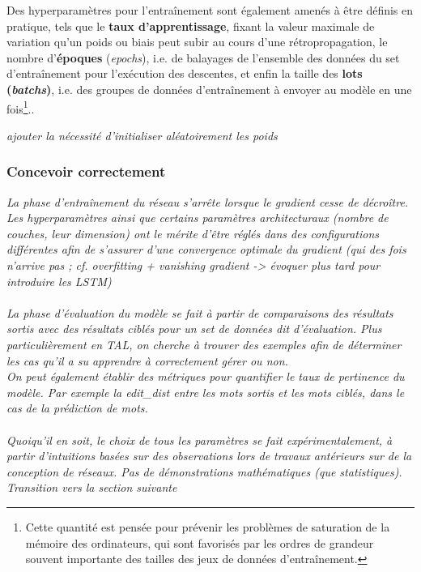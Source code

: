 \documentclass[12pt, french, twoside]{report}
\begin{document}
Des hyperparamètres pour l'entraînement sont également amenés à être définis en pratique, tels que le \textbf{taux d'apprentissage}, fixant la valeur maximale de variation qu'un poids ou biais peut subir au cours d'une rétropropagation, le nombre d'\textbf{époques} (\textit{epochs}), i.e. de balayages de l'ensemble des données du set d'entraînement pour l'exécution des descentes, et enfin la taille des \textbf{lots (\textit{batchs})}, i.e. des groupes de données d'entraînement à envoyer au modèle en une fois\footnote{Cette quantité est pensée pour prévenir les problèmes de saturation de la mémoire des ordinateurs, qui sont favorisés par les ordres de grandeur souvent importante des tailles des jeux de données d'entraînement.}.\cite[17-23]{jurafsky_ffnn}.\cite[21]{fourrier}

\textit{ajouter la nécessité d'initialiser aléatoirement les poids}

\subsubsection{Concevoir correctement}

\textit{
    La phase d'entraînement du réseau s'arrête lorsque le gradient cesse de décroître.\\
    Les hyperparamètres ainsi que certains paramètres architecturaux (nombre de couches, leur dimension) ont le mérite d'être réglés dans des configurations différentes afin de s'assurer d'une convergence optimale du gradient (qui des fois n'arrive pas ; cf. overfitting + vanishing gradient -> évoquer plus tard pour introduire les LSTM)\\
    \\
    La phase d'évaluation du modèle se fait à partir de comparaisons des résultats sortis avec des résultats ciblés pour un set de données dit d'évaluation. Plus particulièrement en TAL, on cherche à trouver des exemples afin de déterminer les cas qu'il a su apprendre à correctement gérer ou non.\\
    On peut également établir des métriques pour quantifier le taux de pertinence du modèle.
    Par exemple la \gls{edit_dist} entre les mots sortis et les mots ciblés, dans le cas de la prédiction de mots.\\
    \\
    Quoiqu'il en soit, le choix de tous les paramètres se fait expérimentalement, à partir d'intuitions basées sur des observations lors de travaux antérieurs sur de la conception de réseaux. Pas de démonstrations mathématiques (que statistiques).\\
    Transition vers la section suivante
    }
\end{document}
